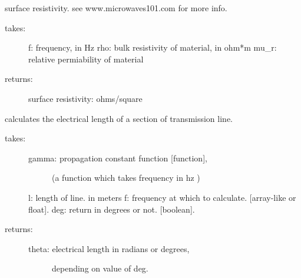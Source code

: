 \documentclass[letterpaper,10pt,english]{sphinxmanual}
\begin{document}

\begin{fulllineitems}
\label{api/mwavepy:mwavepy.tlineFunctions.surface_resistivity}
surface resistivity. see www.microwaves101.com for more info.
\begin{description}
\item[{takes:}] \leavevmode
f: frequency, in Hz
rho: bulk resistivity of material, in ohm*m
mu\_r: relative permiability of material

\item[{returns:}] \leavevmode
surface resistivity: ohms/square

\end{description}

\end{fulllineitems}


\begin{fulllineitems}
\label{api/mwavepy:mwavepy.tlineFunctions.theta}
calculates the electrical length of a section of transmission line.
\begin{description}
\item[{takes:}] \leavevmode\begin{description}
\item[{gamma: propagation constant function {[}function{]}, }] \leavevmode
(a function which takes frequency in hz )

\end{description}

l: length of line. in meters
f: frequency at which to calculate. {[}array-like or float{]}. 
deg: return in degrees or not. {[}boolean{]}.

\item[{returns:}] \leavevmode\begin{description}
\item[{theta: electrical length in radians or degrees, }] \leavevmode
depending on  value of deg.

\end{description}

\end{description}

\end{fulllineitems}
\end{document}
